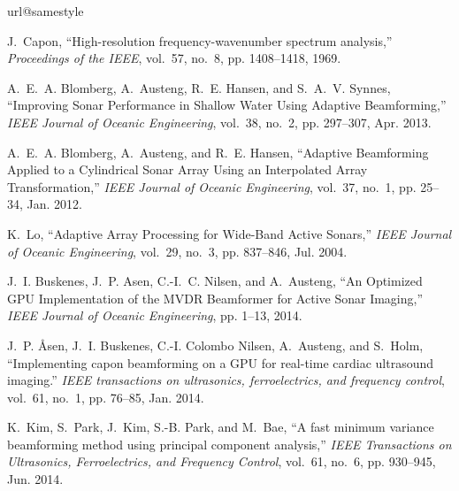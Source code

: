 \documentclass[10pt,journal,draftclsnofoot,onecolumn]{IEEEtran}
\newcommand\1{\vec 1}
\begin{document}
\begin{thebibliography}{10}
\providecommand{\url}[1]{#1}
\csname url@samestyle\endcsname
\providecommand{\newblock}{\relax}
\providecommand{\bibinfo}[2]{#2}
\providecommand{\BIBentrySTDinterwordspacing}{\spaceskip=0pt\relax}
\providecommand{\BIBentryALTinterwordstretchfactor}{4}
\providecommand{\BIBentryALTinterwordspacing}{\spaceskip=\fontdimen2\font plus
\BIBentryALTinterwordstretchfactor\fontdimen3\font minus
  \fontdimen4\font\relax}
\providecommand{\BIBforeignlanguage}[2]{{%
\expandafter\ifx\csname l@#1\endcsname\relax
\typeout{** WARNING: IEEEtran.bst: No hyphenation pattern has been}%
\typeout{** loaded for the language `#1'. Using the pattern for}%
\typeout{** the default language instead.}%
\else
\language=\csname l@#1\endcsname
\fi
#2}}
\providecommand{\BIBdecl}{\relax}
\BIBdecl

J.~Capon, ``{High-resolution frequency-wavenumber spectrum analysis},''
  \emph{Proceedings of the IEEE}, vol.~57, no.~8, pp. 1408--1418, 1969.

A.~E.~A. Blomberg, A.~Austeng, R.~E. Hansen, and S.~A.~V. Synnes, ``{Improving
  Sonar Performance in Shallow Water Using Adaptive Beamforming},'' \emph{IEEE
  Journal of Oceanic Engineering}, vol.~38, no.~2, pp. 297--307, Apr. 2013.

A.~E.~A. Blomberg, A.~Austeng, and R.~E. Hansen, ``{Adaptive Beamforming
  Applied to a Cylindrical Sonar Array Using an Interpolated Array
  Transformation},'' \emph{IEEE Journal of Oceanic Engineering}, vol.~37,
  no.~1, pp. 25--34, Jan. 2012.

K.~Lo, ``{Adaptive Array Processing for Wide-Band Active Sonars},'' \emph{IEEE
  Journal of Oceanic Engineering}, vol.~29, no.~3, pp. 837--846, Jul. 2004.

J.~I. Buskenes, J.~P. Asen, C.-I.~C. Nilsen, and A.~Austeng, ``{An Optimized
  GPU Implementation of the MVDR Beamformer for Active Sonar Imaging},''
  \emph{IEEE Journal of Oceanic Engineering}, pp. 1--13, 2014.

J.~P. \AA{}sen, J.~I. Buskenes, C.-I. {Colombo Nilsen}, A.~Austeng, and
  S.~Holm, ``{Implementing capon beamforming on a GPU for real-time cardiac
  ultrasound imaging.}'' \emph{IEEE transactions on ultrasonics,
  ferroelectrics, and frequency control}, vol.~61, no.~1, pp. 76--85, Jan.
  2014.

K.~Kim, S.~Park, J.~Kim, S.-B. Park, and M.~Bae, ``{A fast minimum variance
  beamforming method using principal component analysis},'' \emph{IEEE
  Transactions on Ultrasonics, Ferroelectrics, and Frequency Control}, vol.~61,
  no.~6, pp. 930--945, Jun. 2014.


\end{thebibliography}
\end{document}
